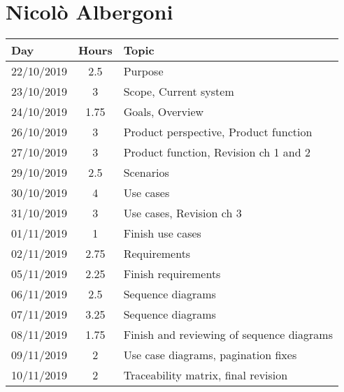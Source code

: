 \section{Nicolò Albergoni}
\begin{table}[H]
  \centering
  \begin{tabularx}{\textwidth}{ |l|c|X| }
      \hline
      Day & Hours & Topic \\
      \hline
      22/10/2019 & 2.5 & Purpose \\								
      \hline
      23/10/2019 & 3 & Scope, Current system \\
      \hline
      24/10/2019 & 1.75	& Goals, Overview\\
      \hline								
      26/10/2019 & 3	& Product perspective, Product function\\									
      \hline
      27/10/2019 & 3 & Product function, Revision ch 1 and 2 \\									
      \hline
      29/10/2019 & 2.5 & Scenarios \\									
      \hline
      30/10/2019 & 4 & Use cases \\									
      \hline
      31/10/2019 & 3 & Use cases, Revision ch 3 \\
      \hline
      01/11/2019 & 1 & Finish use cases \\									
      \hline
      02/11/2019 & 2.75 & Requirements \\									
      \hline
      05/11/2019 & 2.25 & Finish requirements \\									
      \hline
      06/11/2019 & 2.5 & Sequence diagrams \\									
      \hline
      07/11/2019 & 3.25 & Sequence diagrams \\						
      \hline
      08/11/2019 & 1.75 & Finish and reviewing of sequence diagrams \\
      \hline
      09/11/2019 & 2 & Use case diagrams, pagination fixes	\\
      \hline
      10/11/2019 & 2 & Traceability matrix, final revision	\\
      \hline        							
  \end{tabularx}
\end{table}
